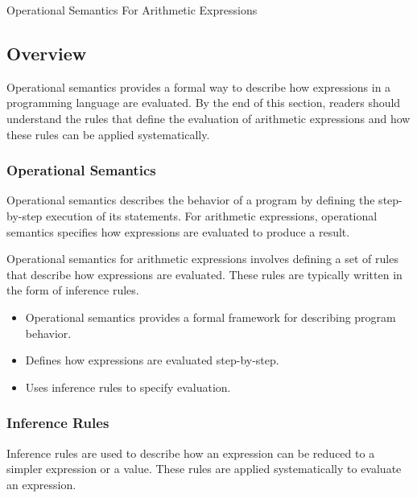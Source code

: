 \begin{notes}{Operational Semantics For Arithmetic Expressions}
    \subsection*{Overview}

    Operational semantics provides a formal way to describe how expressions in a programming language are evaluated. By the end of this section, readers should understand the rules that define the 
    evaluation of arithmetic expressions and how these rules can be applied systematically.
    
    \subsubsection*{Operational Semantics}
    
    Operational semantics describes the behavior of a program by defining the step-by-step execution of its statements. For arithmetic expressions, operational semantics specifies how expressions 
    are evaluated to produce a result.
    
    \begin{highlight}
    
        Operational semantics for arithmetic expressions involves defining a set of rules that describe how expressions are evaluated. These rules are typically written in the form of inference rules.
    
        \begin{itemize}
            \item Operational semantics provides a formal framework for describing program behavior.
            \item Defines how expressions are evaluated step-by-step.
            \item Uses inference rules to specify evaluation.
        \end{itemize}
    
    \end{highlight}
    
    \subsubsection*{Inference Rules}
    
    Inference rules are used to describe how an expression can be reduced to a simpler expression or a value. These rules are applied systematically to evaluate an expression.
    

\end{notes}

